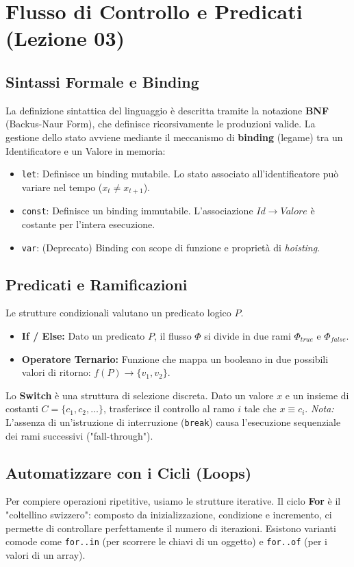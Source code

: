 \section{Flusso di Controllo e Predicati (Lezione 03)}

\subsection{Sintassi Formale e Binding}
La definizione sintattica del linguaggio è descritta tramite la notazione \textbf{BNF} (Backus-Naur Form), che definisce ricorsivamente le produzioni valide.
La gestione dello stato avviene mediante il meccanismo di \textbf{binding} (legame) tra un Identificatore e un Valore in memoria:
\begin{itemize}
    \item \texttt{let}: Definisce un binding mutabile. Lo stato associato all'identificatore può variare nel tempo ($x_t \neq x_{t+1}$).
    \item \texttt{const}: Definisce un binding immutabile. L'associazione $Id \to Valore$ è costante per l'intera esecuzione.
    \item \texttt{var}: (Deprecato) Binding con scope di funzione e proprietà di \textit{hoisting}.
\end{itemize}

\subsection{Predicati e Ramificazioni}
Le strutture condizionali valutano un predicato logico $P$.
\begin{itemize}
    \item \textbf{If / Else:} Dato un predicato $P$, il flusso $\Phi$ si divide in due rami $\Phi_{true}$ e $\Phi_{false}$.
    \item \textbf{Operatore Ternario:} Funzione che mappa un booleano in due possibili valori di ritorno: $f(P) \to \{v_1, v_2\}$.
\end{itemize}

Lo \textbf{Switch} è una struttura di selezione discreta. Dato un valore $x$ e un insieme di costanti $C = \{c_1, c_2, \dots\}$, trasferisce il controllo al ramo $i$ tale che $x \equiv c_i$.
\textit{Nota:} L'assenza di un'istruzione di interruzione (\texttt{break}) causa l'esecuzione sequenziale dei rami successivi ("fall-through").

\subsection{Automatizzare con i Cicli (Loops)}
Per compiere operazioni ripetitive, usiamo le strutture iterative.
Il ciclo \textbf{For} è il "coltellino swizzero": composto da inizializzazione, condizione e incremento, ci permette di controllare perfettamente il numero di iterazioni. Esistono varianti comode come \texttt{for..in} (per scorrere le chiavi di un oggetto) e \texttt{for..of} (per i valori di un array).

